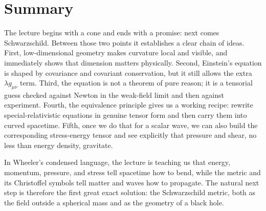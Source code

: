 \section{Summary}

The lecture begins with a cone and ends with a promise: next comes Schwarzschild. Between those two points it establishes a clear chain of ideas. First, low-dimensional geometry makes curvature local and visible, and immediately shows that dimension matters physically. Second, Einstein's equation is shaped by covariance and covariant conservation, but it still allows the extra \(\lambda g_{\mu\nu}\) term. Third, the equation is not a theorem of pure reason; it is a tensorial guess checked against Newton in the weak-field limit and then against experiment. Fourth, the equivalence principle gives us a working recipe: rewrite special-relativistic equations in genuine tensor form and then carry them into curved spacetime. Fifth, once we do that for a scalar wave, we can also build the corresponding stress-energy tensor and see explicitly that pressure and shear, no less than energy density, gravitate.

In Wheeler's condensed language, the lecture is teaching us that energy, momentum, pressure, and stress tell spacetime how to bend, while the metric and its Christoffel symbols tell matter and waves how to propagate. The natural next step is therefore the first great exact solution: the Schwarzschild metric, both as the field outside a spherical mass and as the geometry of a black hole.